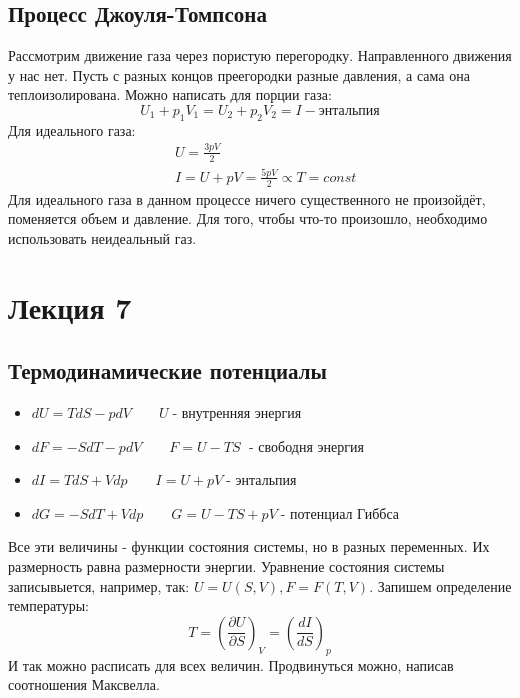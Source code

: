 \documentclass[a4paper, 12pt]{article}
\begin{document}
	\subsection{Процесс Джоуля-Томпсона}
	Рассмотрим движение газа через пористую перегородку. Направленного движения у нас нет. Пусть с разных концов преегородки разные давления, а сама она теплоизолирована. Можно написать для порции газа:
	\begin{equation*}
		U_{1} + p_{1} V_{1} = U_{2} + p_{2} V_{2} = I - \text{энтальпия}
	\end{equation*}
	Для идеального газа:
	\begin{equation*}
		\begin{aligned}
			& U = \frac{3pV}{2}                            \\
			& I = U + pV = \frac{5pV}{2} \propto T = const 
		\end{aligned}
	\end{equation*}
	Для идеального газа в данном процессе ничего существенного не произойдёт, поменяется объем и давление. Для того, чтобы что-то произошло, необходимо использовать неидеальный газ. 
	\section{Лекция 7}
	\subsection{Термодинамические потенциалы}
	\begin{itemize}
		\item $dU = TdS - pdV \qquad U \;	\text{-  внутренняя энергия}$
		\item $dF = -SdT - pdV \qquad F = U - TS \; \text{ - свободня энергия}$
		\item $dI = TdS + Vdp \qquad I = U +pV \;	\text{- энтальпия}$
		\item $dG = -SdT + Vdp \qquad G = U-TS+pV 	 \;\text{- потенциал Гиббса}$
	\end{itemize}
	Все эти величины - функции состояния системы, но в разных переменных. Их размерность равна размерности энергии. Уравнение состояния системы записывыется, например, так: $U=U(S,V), F=F(T,V)$. Запишем определение температуры:
	\begin{equation*}
		T = (\frac{\partial U}{\partial S})_{V} = (\frac{dI}{dS})_{p}
	\end{equation*}
	И так можно расписать для всех величин. Продвинуться можно, написав соотношения Максвелла.
\end{document}
